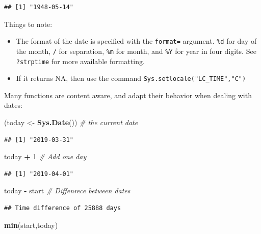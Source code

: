 \documentclass[]{book}
\newenvironment{Shaded}{\begin{snugshade}}{\end{snugshade}}
\newcommand{\KeywordTok}[1]{\textcolor[rgb]{0.13,0.29,0.53}{\textbf{#1}}}
\newcommand{\DecValTok}[1]{\textcolor[rgb]{0.00,0.00,0.81}{#1}}
\newcommand{\StringTok}[1]{\textcolor[rgb]{0.31,0.60,0.02}{#1}}
\newcommand{\CommentTok}[1]{\textcolor[rgb]{0.56,0.35,0.01}{\textit{#1}}}
\newcommand{\OperatorTok}[1]{\textcolor[rgb]{0.81,0.36,0.00}{\textbf{#1}}}
\newcommand{\NormalTok}[1]{#1}
\providecommand{\tightlist}{%
  \setlength{\itemsep}{0pt}\setlength{\parskip}{0pt}}
\theoremstyle{definition}
\theoremstyle{definition}
\theoremstyle{definition}
\theoremstyle{remark}
\begin{document}
\begin{verbatim}
## [1] "1948-05-14"
\end{verbatim}

Things to note:

\begin{itemize}
\tightlist
\item
  The format of the date is specified with the \texttt{format=}
  argument. \texttt{\%d} for day of the month, \texttt{/} for
  separation, \texttt{\%m} for month, and \texttt{\%Y} for year in four
  digits. See \texttt{?strptime} for more available formatting.
\item
  If it returns NA, then use the command
  \texttt{Sys.setlocale("LC\_TIME","C")}
\end{itemize}

Many functions are content aware, and adapt their behavior when dealing
with dates:

\begin{Shaded}
\begin{Highlighting}[]
\NormalTok{(today <-}\StringTok{ }\KeywordTok{Sys.Date}\NormalTok{()) }\CommentTok{# the current date}
\end{Highlighting}
\end{Shaded}

\begin{verbatim}
## [1] "2019-03-31"
\end{verbatim}

\begin{Shaded}
\begin{Highlighting}[]
\NormalTok{today }\OperatorTok{+}\StringTok{ }\DecValTok{1} \CommentTok{# Add one day}
\end{Highlighting}
\end{Shaded}

\begin{verbatim}
## [1] "2019-04-01"
\end{verbatim}

\begin{Shaded}
\begin{Highlighting}[]
\NormalTok{today }\OperatorTok{-}\StringTok{ }\NormalTok{start }\CommentTok{# Diffenrece between dates}
\end{Highlighting}
\end{Shaded}

\begin{verbatim}
## Time difference of 25888 days
\end{verbatim}

\begin{Shaded}
\begin{Highlighting}[]
\KeywordTok{min}\NormalTok{(start,today)}
\end{Highlighting}
\end{Shaded}
\end{document}
